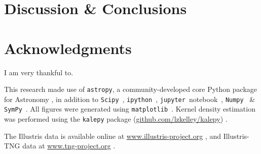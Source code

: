 \documentclass[useAMS, usenatbib]{mnras}
\begin{document}



\section{Discussion \& Conclusions}
    \label{sec:disc}








\section*{Acknowledgments}
	I am very thankful to.

    This research made use of \texttt{astropy}, a community-developed core Python package for Astronomy \citep{astropy2013}, in addition to \texttt{Scipy}~\citep{scipy}, \texttt{ipython}~\citep{ipython}, \texttt{jupyter}~notebook~\citep{jupyter}, \texttt{Numpy}~\citep{numpy2011} \& \texttt{SymPy}~\citep{sympy2017}.  All figures were generated using \texttt{matplotlib}~\citep{matplotlib2007}.  Kernel density estimation was performed using the \texttt{kalepy}{} package (\href{https://github.com/lzkelley/kalepy}{github.com/lzkelley/kalepy}) \citep{kalepy2021}.

    The Illustris data is available online at \href{https://www.illustris-project.org/}{www.illustris-project.org} \citep{Nelson+2015}, and Illustris-TNG data at \href{https://www.tng-project.org/}{www.tng-project.org} \citep{Nelson+2019}.



\let\oldUrl\url
\renewcommand{\url}[1]{\href{#1}{Link}}

\quad{}



\onecolumn
\clearpage



\appendix
\end{document}
